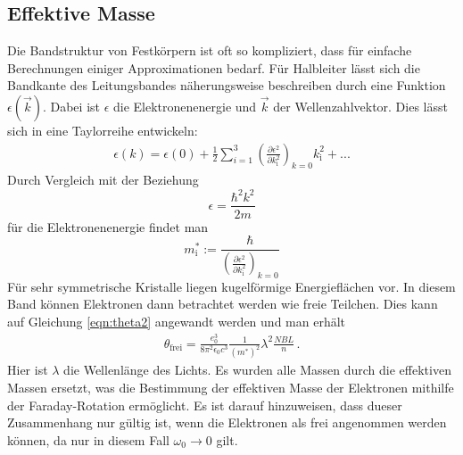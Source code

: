 \subsection{Effektive Masse}
\label{subsec:effmass}
Die Bandstruktur von Festkörpern ist oft so kompliziert, dass für einfache Berechnungen
einiger Approximationen bedarf. Für Halbleiter lässt sich die Bandkante des Leitungsbandes
näherungsweise beschreiben durch eine Funktion $\epsilon(\vec{k})$. Dabei ist
$\epsilon$ die Elektronenenergie und $\vec{k}$ der Wellenzahlvektor. Dies lässt sich
in eine Taylorreihe entwickeln:
\begin{align}
  \epsilon(k) = \epsilon (0) + \frac{1}{2} \sum_{i=1}^3 \left(\frac{\partial \epsilon^2}{\partial k^2_{\mathrm{i}}}\right)_{k=0} k_{\mathrm{i}}^2 + ...
  \label{eqn:taylor}
\end{align}
Durch Vergleich mit der Beziehung
\begin{equation}
  \epsilon = \frac{\hbar^2 k^2}{2m}
  \label{eqn:elektronenergie}
\end{equation}
für die Elektronenenergie findet man
\begin{equation}
   m^*_{\mathrm{i}} := \frac{\hbar}{\left(\frac{\partial \epsilon^2}{\partial k^2_{\mathrm{i}}}\right)_{k=0}}
   \label{eqn:effmass}
\end{equation}
Für sehr symmetrische Kristalle liegen kugelförmige Energieflächen vor. In diesem
Band können Elektronen dann betrachtet werden wie freie Teilchen. Dies kann auf
Gleichung \ref{eqn:theta2} angewandt werden und man erhält
\begin{align}
  \theta_{\mathrm{frei}} = \frac{e^3_0}{8 \pi^2 \epsilon_0 c^3}\frac{1}{\left(m^{*}\right)^2} \lambda^2 \frac{NBL}{n} \,.
  \label{eqn:theta}
\end{align}
Hier ist $\lambda$ die Wellenlänge des Lichts. Es wurden alle Massen durch die effektiven
Massen ersetzt, was die Bestimmung der effektiven Masse der Elektronen mithilfe der
Faraday-Rotation ermöglicht. Es ist darauf hinzuweisen, dass dueser Zusammenhang nur
gültig ist, wenn die Elektronen als frei angenommen werden können, da nur in diesem
Fall $\omega_0 \rightarrow 0$ gilt.
